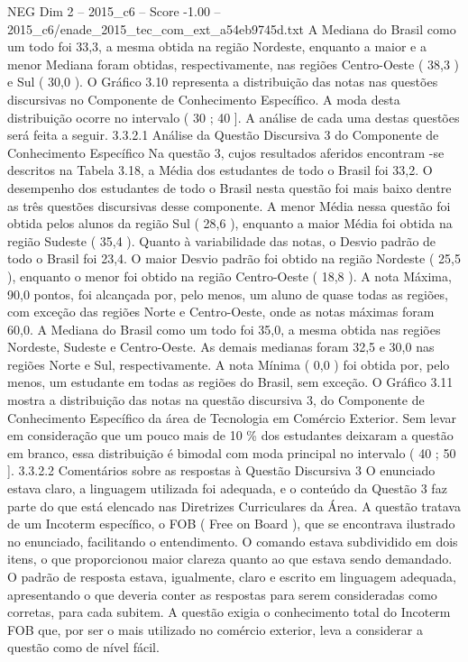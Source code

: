 \begin{textsample}{NEG Dim 2 – 2015\_c6 – Score -1.00 – 2015\_c6/enade\_2015\_tec\_com\_ext\_a54eb9745d.txt}
A Mediana do Brasil como um todo foi 33,3, a mesma obtida na região Nordeste, enquanto a maior e a menor Mediana foram obtidas, respectivamente, nas regiões Centro-Oeste ( 38,3 ) e Sul ( 30,0 ).
O Gráfico 3.10 representa a distribuição das notas nas questões discursivas no Componente de Conhecimento Específico.
A moda desta distribuição ocorre no intervalo ( 30 ; 40 ].
A análise de cada uma destas questões será feita a seguir. 3.3.2.1 Análise da Questão Discursiva 3 do Componente de Conhecimento Específico Na questão 3, cujos resultados aferidos encontram -se descritos na Tabela 3.18, a Média dos estudantes de todo o Brasil foi 33,2.
O desempenho dos estudantes de todo o Brasil nesta questão foi mais baixo dentre as três questões discursivas desse componente.
A menor Média nessa questão foi obtida pelos alunos da região Sul ( 28,6 ), enquanto a maior Média foi obtida na região Sudeste ( 35,4 ).
Quanto à variabilidade das notas, o Desvio padrão de todo o Brasil foi 23,4.
O maior Desvio padrão foi obtido na região Nordeste ( 25,5 ), enquanto o menor foi obtido na região Centro-Oeste ( 18,8 ).
A nota Máxima, 90,0 pontos, foi alcançada por, pelo menos, um aluno de quase todas as regiões, com exceção das regiões Norte e Centro-Oeste, onde as notas máximas foram 60,0.
A Mediana do Brasil como um todo foi 35,0, a mesma obtida nas regiões Nordeste, Sudeste e Centro-Oeste.
As demais medianas foram 32,5 e 30,0 nas regiões Norte e Sul, respectivamente.
A nota Mínima ( 0,0 ) foi obtida por, pelo menos, um estudante em todas as regiões do Brasil, sem exceção.
O Gráfico 3.11 mostra a distribuição das notas na questão discursiva 3, do Componente de Conhecimento Específico da área de Tecnologia em Comércio Exterior.
Sem levar em consideração que um pouco mais de 10 \% dos estudantes deixaram a questão em branco, essa distribuição é bimodal com moda principal no intervalo ( 40 ; 50 ]. 3.3.2.2 Comentários sobre as respostas à Questão Discursiva 3 O enunciado estava claro, a linguagem utilizada foi adequada, e o conteúdo da Questão 3 faz parte do que está elencado nas Diretrizes Curriculares da Área.
A questão tratava de um Incoterm específico, o FOB ( Free on Board ), que se encontrava ilustrado no enunciado, facilitando o entendimento.
O comando estava subdividido em dois itens, o que proporcionou maior clareza quanto ao que estava sendo demandado.
O padrão de resposta estava, igualmente, claro e escrito em linguagem adequada, apresentando o que deveria conter as respostas para serem consideradas como corretas, para cada subitem.
A questão exigia o conhecimento total do Incoterm FOB que, por ser o mais utilizado no comércio exterior, leva a considerar a questão como de nível fácil.

\end{textsample}
